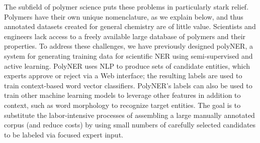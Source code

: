 The subfield of polymer science puts these problems in particularly stark relief.
Polymers have their own unique nomenclature, as we explain below, and thus annotated datasets created for general
chemistry are of little value.
Scientists and engineers lack access to a freely available large database of polymers and their properties.
To address these challenges, we have previously designed polyNER, a system for generating training data for scientific NER using semi-supervised and active learning.
PolyNER uses NLP to produce sets of candidate entities, which
experts 
approve or reject via a 
Web interface;
the resulting labels are used to train context-based word vector classifiers. %
PolyNER's labels can also be used to train other machine learning models to leverage other features in addition to context, such as word morphology
to recognize target entities.
The goal is
to substitute the labor-intensive processes of assembling a large
manually annotated corpus (and reduce costs) by using small numbers of carefully selected candidates to be labeled via focused expert input. 

